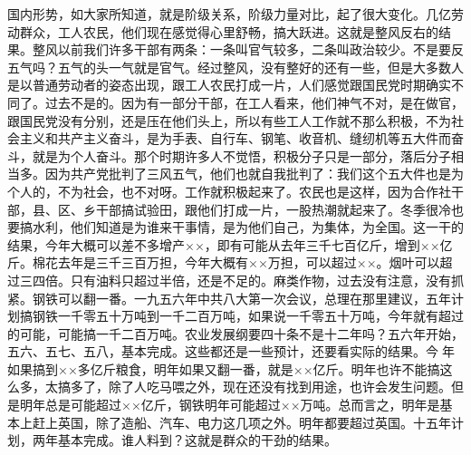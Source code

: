 国内形势，如大家所知道，就是阶级关系，阶级力量对比，起了很大变化。几亿劳动群众，工人农民，他们现在感觉得心里舒畅，搞大跃进。这就是整风反右的结果。整风以前我们许多干部有两条：一条叫官气较多，二条叫政治较少。不是要反五气吗？五气的头一气就是官气。经过整风，没有整好的还有一些，但是大多数人是以普通劳动者的姿态出现，跟工人农民打成一片，人们感觉跟国民党时期确实不同了。过去不是的。因为有一部分干部，在工人看来，他们神气不对，是在做官，跟国民党没有分别，还是压在他们头上，所以有些工人工作就不那么积极，不为社会主义和共产主义奋斗，是为手表、自行车、钢笔、收音机、缝纫机等五大件而奋斗，就是为个人奋斗。那个时期许多人不觉悟，积极分子只是一部分，落后分子相当多。因为共产党批判了三风五气，他们也就自我批判了：我们这个五大件也是为个人的，不为社会，也不对呀。工作就积极起来了。农民也是这样，因为合作社干部，县、区、乡干部搞试验田，跟他们打成一片，一股热潮就起来了。冬季很冷也要搞水利，他们知道是为谁来干事情，是为他们自己，为集体，为全国。这一干的结果，今年大概可以差不多增产××，即有可能从去年三千七百亿斤，增到××亿斤。棉花去年是三千三百万担，今年大概有××万担，可以超过××。烟叶可以超过三四倍。只有油料只超过半倍，还是不足的。麻类作物，过去没有注意，没有抓紧。钢铁可以翻一番。一九五六年中共八大第一次会议，总理在那里建议，五年计划搞钢铁一千零五十万吨到一千二百万吨，如果说一千零五十万吨，今年就有超过的可能，可能搞一千二百万吨。农业发展纲要四十条不是十二年吗？五六年开始，五六、五七、五八，基本完成。这些都还是一些预计，还要看实际的结果。今年如果搞到××多亿斤粮食，明年如果又翻一番，就是××亿斤。明年也许不能搞这么多，太搞多了，除了人吃马喂之外，现在还没有找到用途，也许会发生问题。但是明年总是可能超过××亿斤，钢铁明年可能超过××万吨。总而言之，明年是基本上赶上英国，除了造船、汽车、电力这几项之外。明年都要超过英国。十五年计划，两年基本完成。谁人料到？这就是群众的干劲的结果。

